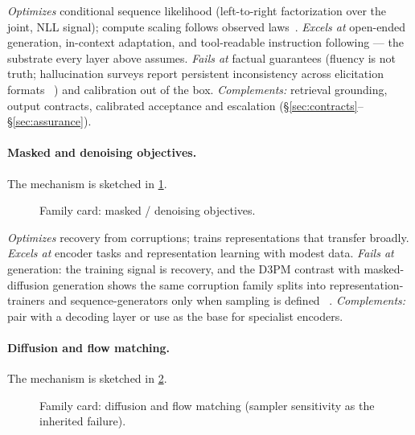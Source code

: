 \documentclass[11pt]{article}
\begin{document}
\textit{Optimizes} conditional sequence likelihood (left-to-right factorization over the joint, NLL signal); compute scaling follows observed
laws~\cite{kaplan2020scaling,hoffmann2022compute}. \textit{Excels at} open-ended generation,
in-context adaptation, and tool-readable instruction following --- the substrate every layer
above assumes. \textit{Fails at} factual guarantees (fluency is not truth; hallucination
surveys report persistent inconsistency across elicitation formats
~\cite{id251006265}) and calibration out of the box. \textit{Complements:} retrieval
grounding, output contracts, calibrated acceptance and escalation (\S\ref{sec:contracts}--\S\ref{sec:assurance}).

\paragraph{Masked and denoising objectives.}
\noindent The mechanism is sketched in \cref{fig:fam-masked}.

\begin{figure}[t]\centering
  \resizebox{\linewidth}{!}{}
  \caption{Family card: masked / denoising objectives.}
  \label{fig:fam-masked}
\end{figure}

\textit{Optimizes} recovery from corruptions; trains representations that transfer broadly.
\textit{Excels at} encoder tasks and representation learning with modest data.
\textit{Fails at} generation: the training signal is recovery, and the D3PM contrast with
masked-diffusion generation shows the same corruption family splits into
representation-trainers and sequence-generators only when sampling is defined
~\cite{austin2021d3pm,mdm2025orderar}. \textit{Complements:} pair with a decoding layer or
use as the base for specialist encoders.

\paragraph{Diffusion and flow matching.}
\noindent The mechanism is sketched in \cref{fig:fam-diffusion}.

\begin{figure}[t]\centering
  \resizebox{\linewidth}{!}{}
  \caption{Family card: diffusion and flow matching (sampler sensitivity as the inherited failure).}
  \label{fig:fam-diffusion}
\end{figure}
\end{document}
